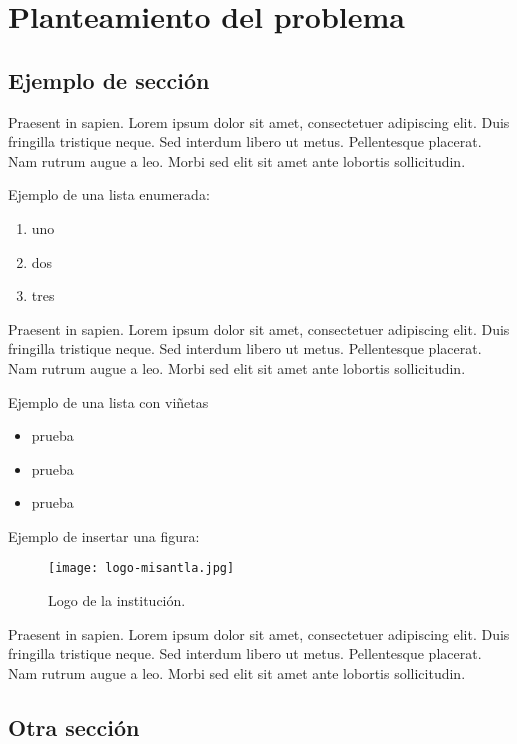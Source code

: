 \chapter{Planteamiento del problema}
\section{Ejemplo de sección}

Praesent in sapien. Lorem ipsum dolor sit amet, consectetuer adipiscing 
elit. Duis fringilla tristique neque. Sed interdum libero ut metus. 
Pellentesque placerat. Nam rutrum augue a leo. Morbi sed elit sit amet 
ante lobortis sollicitudin.

Ejemplo de una lista enumerada:

\begin{enumerate}
	\item uno
	\item dos
	\item tres
\end{enumerate}

Praesent in sapien. Lorem ipsum dolor sit amet, consectetuer adipiscing 
elit. Duis fringilla tristique neque. Sed interdum libero ut metus. 
Pellentesque placerat. Nam rutrum augue a leo. Morbi sed elit sit amet 
ante lobortis sollicitudin.

Ejemplo de una lista con viñetas

\begin{itemize}
 \item prueba 
 \item prueba 
 \item prueba
\end{itemize}

Ejemplo de insertar una figura:
\begin{figure}[H]
	\caption{Logo de la institución.}
	\centering
	\texttt{[image: logo-misantla.jpg]}
\end{figure}

Praesent in sapien. Lorem ipsum dolor sit amet, consectetuer adipiscing 
elit. Duis fringilla tristique neque. Sed interdum libero ut metus. 
Pellentesque placerat. Nam rutrum augue a leo. Morbi sed elit sit amet 
ante lobortis sollicitudin.

\section{Otra sección}


